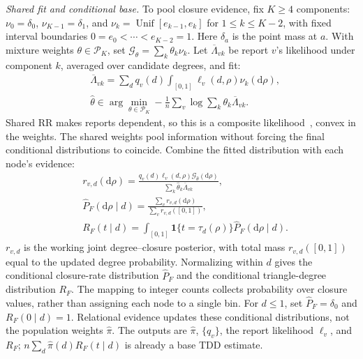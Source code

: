 \emph{Shared fit and conditional base.} To pool closure evidence, fix $K\ge4$ components: $\nu_0=\delta_0$, $\nu_{K-1}=\delta_1$, and $\nu_k=\operatorname{Unif}[e_{k-1},e_k]$ for $1\le k\le K-2$, with fixed interval boundaries $0=e_0<\cdots<e_{K-2}=1$. Here $\delta_a$ is the point mass at $a$. With mixture weights $\theta\in\mathcal P_K$, set $\mathcal G_\theta=\sum_k\theta_k\nu_k$. Let $\overline\Lambda_{vk}$ be report $v$'s likelihood under component $k$, averaged over candidate degrees, and fit:
\begin{equation}
\begin{aligned}
&\overline\Lambda_{vk}=\sum_d q_v(d)
\int_{[0,1]}\ell_v(d,\rho)\nu_k(\mathrm d\rho),\\
&\widehat\theta\in\arg\min_{\theta\in\mathcal P_K}
-\frac1n\sum_v\log\sum_k\theta_k\overline\Lambda_{vk}.
\end{aligned}
\label{eq:shared_closure_fit}
\end{equation}
Shared RR makes reports dependent, so this is a composite likelihood~\cite{varin2011overview}, convex in the weights. The shared weights pool information without forcing the final conditional distributions to coincide. Combine the fitted distribution with each node's evidence:
\begin{equation}
\begin{aligned}
&r_{v,d}(\mathrm d\rho)=
\frac{q_v(d)\ell_v(d,\rho)\mathcal G_{\widehat\theta}(\mathrm d\rho)}
{\sum_k\widehat\theta_k\overline\Lambda_{vk}},\\
&\widehat P_F(\mathrm d\rho\mid d)=
\frac{\sum_v r_{v,d}(\mathrm d\rho)}{\sum_v r_{v,d}([0,1])},\\
&R_F(t\mid d)=\int_{[0,1]}\mathbf1\{t=\tau_d(\rho)\}
\widehat P_F(\mathrm d\rho\mid d).
\end{aligned}
\label{eq:joint_latent_posterior}
\end{equation}
$r_{v,d}$ is the working joint degree--closure posterior, with total mass $r_{v,d}([0,1])$ equal to the updated degree probability. Normalizing within $d$ gives the conditional closure-rate distribution $\widehat P_F$ and the conditional triangle-degree distribution $R_F$. The mapping to integer counts collects probability over closure values, rather than assigning each node to a single bin. For $d\le1$, set $\widehat P_F=\delta_0$ and $R_F(0\mid d)=1$. Relational evidence updates these conditional distributions, not the population weights $\widehat\pi$. The outputs are $\widehat\pi$, $\{q_v\}$, the report likelihood $\ell_v$, and $R_F$; $n\sum_d\widehat\pi(d)R_F(t\mid d)$ is already a base TDD estimate.


